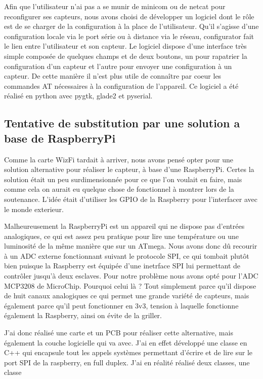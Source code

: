 {		Afin que l'utilisateur n'ai pas a se munir de minicom ou de netcat pour reconfigurer
		ses capteurs, nous avons choisi de développer un logiciel dont le rôle est de se
		charger de la configuration à la place de l'utilisateur. Qu'il s'agisse d'une configuration
		locale via le port série ou à distance via le réseau, configurator fait le lien
		entre l'utilisateur et son capteur. Le logiciel dispose d'une interface très simple composée
		de quelques champs et de deux boutons, un pour rapatrier la configuration d'un capteur et l'autre
		pour envoyer une configuration à un capteur. De cette manière il n'est plus utile de connaître
		par coeur les commandes AT nécessaires à la configuration de l'appareil. Ce logiciel a été
		réalisé en python avec pygtk, glade2 et pyserial.
	
	\subsection{Tentative de substitution par une solution a base de RaspberryPi}
		Comme la carte WizFi tardait à arriver, nous avons pensé opter pour une solution alternative
		pour réaliser le capteur, à base d'une RaspberryPi. Certes la solution était un peu surdimensionnée
		pour ce que l'on voulait en faire, mais comme cela on aurait eu quelque chose de fonctionnel
		à montrer lors de la soutenance. L'idée était d'utiliser les GPIO de la Raspberry pour
		l'interfacer avec le monde exterieur.
		\par
		Malheureusement la RaspberryPi est un appareil qui ne dispose pas d'entrées analogiques,
		ce qui est assez peu pratique pour lire une température ou une luminosité de la même manière que
		sur un ATmega. Nous avons donc dû recourir à un ADC externe fonctionnant suivant le protocole SPI,
		ce qui tombait plutôt bien puisque la Raspberry est équipée d'une inetrface SPI lui permettant
		de contrôler jusqu'à deux esclaves. Pour notre problème nous avons opté pour l'ADC MCP3208 de
		MicroChip. Pourquoi celui là ? Tout simplement parce qu'il dispose de huit canaux analogiques ce qui
		permet une grande variété de capteurs, mais également parce qu'il peut fonctionner en 3v3, tension à
		laquelle fonctionne également la Raspberry, ainsi on évite de la griller.
		\par
		J'ai donc réalisé une carte et un PCB pour réaliser cette alternative, mais également
		la couche logicielle qui va avec. J'ai en effet développé une classe en C++ qui
		encapsule tout les appels systèmes permettant d'écrire et de lire sur le port SPI
		de la raspberry, en full duplex. J'ai en réalité réalisé deux classes, une classe
}
